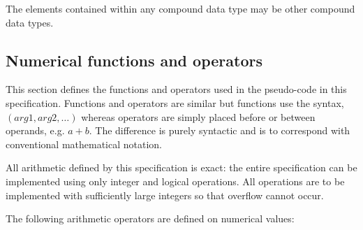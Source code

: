 The elements contained within any compound data type may be other compound data types.


\subsection{Numerical functions and operators}
\label{functionoperators}

This section defines the functions and operators used 
in the pseudo-code in this specification. Functions and operators
are similar but functions use the syntax, $(arg1, arg2,\ldots)$ 
whereas operators are simply placed before or between operands, 
e.g. $a+b$. The difference is purely syntactic and is to 
correspond with conventional mathematical notation.

All arithmetic defined by this specification is exact: the entire 
specification can be implemented using only integer and logical operations.
All operations are to be implemented with sufficiently large integers so 
that overflow cannot occur.

The following arithmetic operators are defined on numerical values:

